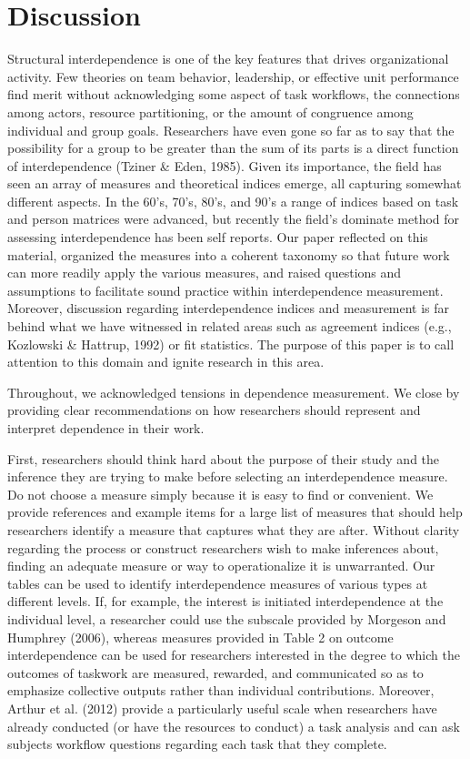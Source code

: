 \documentclass[english,,man]{apa6}
\theoremstyle{definition}
\theoremstyle{definition}
\theoremstyle{definition}
\theoremstyle{remark}
\begin{document}
\hypertarget{discussion}{%
\section{Discussion}\label{discussion}}

Structural interdependence is one of the key features that drives
organizational activity. Few theories on team behavior, leadership, or
effective unit performance find merit without acknowledging some aspect
of task workflows, the connections among actors, resource partitioning,
or the amount of congruence among individual and group goals.
Researchers have even gone so far as to say that the possibility for a
group to be greater than the sum of its parts is a direct function of
interdependence (Tziner \& Eden, 1985). Given its importance, the field
has seen an array of measures and theoretical indices emerge, all
capturing somewhat different aspects. In the 60's, 70's, 80's, and 90's
a range of indices based on task and person matrices were advanced, but
recently the field's dominate method for assessing interdependence has
been self reports. Our paper reflected on this material, organized the
measures into a coherent taxonomy so that future work can more readily
apply the various measures, and raised questions and assumptions to
facilitate sound practice within interdependence measurement. Moreover,
discussion regarding interdependence indices and measurement is far
behind what we have witnessed in related areas such as agreement indices
(e.g., Kozlowski \& Hattrup, 1992) or fit statistics. The purpose of
this paper is to call attention to this domain and ignite research in
this area.

Throughout, we acknowledged tensions in dependence measurement. We close
by providing clear recommendations on how researchers should represent
and interpret dependence in their work.

First, researchers should think hard about the purpose of their study
and the inference they are trying to make before selecting an
interdependence measure. Do not choose a measure simply because it is
easy to find or convenient. We provide references and example items for
a large list of measures that should help researchers identify a measure
that captures what they are after. Without clarity regarding the process
or construct researchers wish to make inferences about, finding an
adequate measure or way to operationalize it is unwarranted. Our tables
can be used to identify interdependence measures of various types at
different levels. If, for example, the interest is initiated
interdependence at the individual level, a researcher could use the
subscale provided by Morgeson and Humphrey (2006), whereas measures
provided in Table 2 on outcome interdependence can be used for
researchers interested in the degree to which the outcomes of taskwork
are measured, rewarded, and communicated so as to emphasize collective
outputs rather than individual contributions. Moreover, Arthur et al.
(2012) provide a particularly useful scale when researchers have already
conducted (or have the resources to conduct) a task analysis and can ask
subjects workflow questions regarding each task that they complete.
\end{document}

